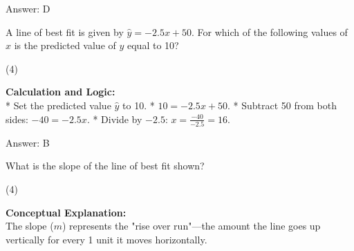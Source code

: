\documentclass[11pt,paper=a4,answers]{exam}
\begin{document}
\begin{questions}
\begin{solution}
\vspace{30pt}

Answer: \colorbox{yellow!100}{D}
\end{solution}

\vspace{60pt}

\question
A line of best fit is given by $\hat{y} = -2.5x + 50$. For which of the following values of $x$ is the predicted value of $y$ equal to 10?
\begin{tasks}(4)
\end{tasks}

\begin{solution}
\textbf{Calculation and Logic:} \\
* Set the predicted value $\hat{y}$ to 10.
* $10 = -2.5x + 50$.
* Subtract 50 from both sides: $-40 = -2.5x$.
* Divide by $-2.5$: $x = \frac{-40}{-2.5} = 16$.

\vspace{30pt}

Answer: \colorbox{yellow!100}{B}
\end{solution}

\vspace{60pt}

\question
\begin{center}
\end{center}
What is the slope of the line of best fit shown?
\begin{tasks}(4)
\end{tasks}

\begin{solution}
\textbf{Conceptual Explanation:} \\
The slope ($m$) represents the "rise over run"—the amount the line goes up vertically for every 1 unit it moves horizontally.


\end{solution}
\end{questions}
\end{document}
